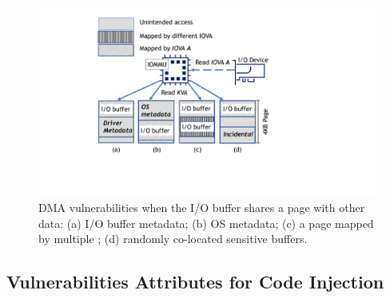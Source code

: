 \begin{figure}[t]
    \centering
    \includegraphics[width=0.8\columnwidth]{figs/subpage.pdf}
    \caption{\subpage{} DMA vulnerabilities when the I/O buffer shares a page with other data: (a) I/O buffer metadata; (b) OS
metadata; (c) a page mapped by multiple \iova; (d) randomly co-located sensitive buffers.}
    \label{fig:colocation}
\end{figure}




\subsection{Vulnerabilities Attributes for Code Injection}\label{sec:mmo}

